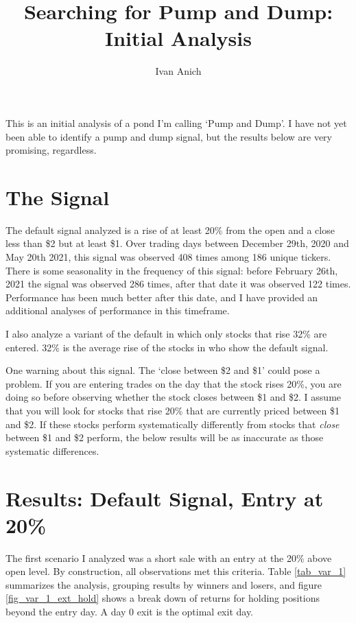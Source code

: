 \documentclass{article}
\title{Searching for Pump and Dump: Initial Analysis}
\author{Ivan Anich}
\begin{document}
\maketitle

This is an initial analysis of a pond I'm calling `Pump and Dump'. I have not yet been able to identify a pump and dump signal, but the results below are very promising, regardless.

\section{The Signal}

The default signal analyzed is a rise of at least 20\% from the open and a close less than \$2 but at least \$1. Over trading days between December 29th, 2020 and May 20th 2021, this signal was observed 408 times among 186 unique tickers. There is some seasonality in the frequency of this signal: before February 26th, 2021 the signal was observed 286 times, after that date it was observed 122 times. Performance has been much better after this date, and I have provided an additional analyses of performance in this timeframe.

I also analyze a variant of the default in which only stocks that rise 32\% are entered. 32\% is the average rise of the stocks in who show the default signal.

One warning about this signal. The `close between \$2 and \$1' could pose a problem. If you are entering trades on the day that the stock rises 20\%, you are doing so before observing whether the stock closes between \$1 and \$2. I assume that you will look for stocks that rise 20\% that are currently priced between \$1 and \$2. If these stocks perform systematically differently from stocks that \textit{close} between \$1 and \$2 perform, the below results will be as inaccurate as those systematic differences.

\section{Results: Default Signal, Entry at 20\%}

The first scenario I analyzed was a short sale with an entry at the 20\% above open level. By construction, all observations met this criteria. Table \ref{tab_var_1} summarizes the analysis, grouping results by winners and losers, and figure \ref{fig_var_1_ext_hold} shows a break down of returns for holding positions beyond the entry day. A day 0 exit is the optimal exit day.
\end{document}
